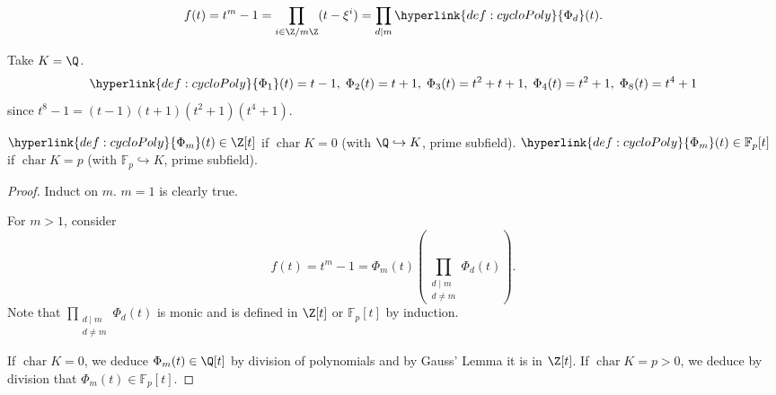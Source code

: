 \documentclass{article}
\DeclareMathOperator{\chara}{char}
\newcommand{\F}{\mathbb{F}}
\begin{document}

\begin{remark}
    \begin{equation*}f(t) = t^m - 1 = \prod_{i \in \Z/m\Z} (t - \xi^i) = \prod_{d \mid m} \hyperlink{def:cycloPoly}{\Phi_d}(t).\end{equation*}
\end{remark}

\begin{eg}
    Take $K = \Q$.
    \begin{equation*}
        \hyperlink{def:cycloPoly}{\Phi_1}(t) = t-1, \; \Phi_2(t) = t+1, \; \Phi_3(t) = t^2 + t + 1, \; \Phi_4(t) = t^2 + 1, \; \Phi_8(t) = t^4 + 1
    \end{equation*}
    since $t^8-1 = (t-1)(t+1)(t^2 + 1)(t^4 + 1)$.
\end{eg}

\begin{nlemma}\label{lem:4.5}
    $\hyperlink{def:cycloPoly}{\Phi_m}(t) \in \Z[t]$ if $\chara K = 0$ (with $\Q \hookrightarrow K$, prime subfield).
    $\hyperlink{def:cycloPoly}{\Phi_m}(t) \in \F_p[t]$ if $\chara K = p$ (with $\F_p \hookrightarrow K$, prime subfield).
\end{nlemma}

\begin{proof}
    Induct on $m$. $m=1$ is clearly true.

    For $m>1$, consider
    \begin{equation*}
        f(t) = t^m - 1 = \Phi_m(t) \left(\prod_{\substack{d \mid m \\ d \neq m}} \Phi_d(t)\right).
    \end{equation*}
    Note that $\prod_{\substack{d \mid m \\ d \neq m}} \Phi_d(t)$ is monic and is defined in $\Z[t]$ or $\F_p[t]$ by induction.

    If $\chara K = 0$, we deduce $\Phi_m(t) \in \Q[t]$ by division of polynomials and by Gauss' Lemma it is in $\Z[t]$.
    If $\chara K = p > 0$, we deduce by division that $\Phi_m(t) \in \F_p[t]$.
\end{proof}
\end{document}
